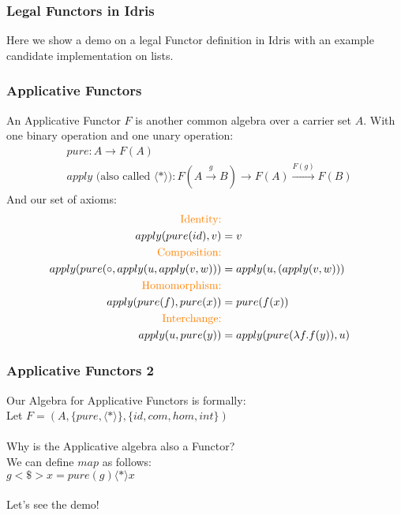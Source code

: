 \documentclass[hyperref={colorlinks = true,linkcolor = blue, citecolor = blue, urlcolor = blue}]{beamer}
\begin{document}
\begin{frame}[fragile]
  \frametitle{Legal Functors in Idris}
  Here we show a demo on a legal Functor definition in Idris with an example
  candidate implementation on lists.
\end{frame}

\begin{frame}[fragile]
  \frametitle{Applicative Functors}
  An Applicative Functor $F$ is another common algebra over a carrier set $A$.
  With one binary operation and one unary operation: 
  \begin{align*}
    &pure : A \rightarrow F(A) \\
    &apply \text{ (also called $\langle \ast \rangle$)} : F(A \overset{g}{\rightarrow} B) \rightarrow F(A) 
               \overset{F(g)}{\rightarrow} F(B)
  \end{align*}
   And our set of axioms:
   \begin{align*}
    \text{\color{orange}{Identity:}}\\
    apply(pure(id), v) &= v \\
    \text{\color{orange}{Composition:}}\\
    apply(pure(\circ,apply(u, apply(v, w))) &= apply(u,(apply(v, w))) \\
    \text{\color{orange}{Homomorphism:}}\\
    apply(pure(f), pure(x)) &= pure(f(x)) \\
    \text{\color{orange}{Interchange:}}\\
    apply(u, pure(y)) &= apply(pure(\lambda f.f(y)),u) 
   \end{align*}
\end{frame}

\begin{frame}[fragile]
  \frametitle{Applicative Functors 2}
  Our Algebra for Applicative Functors is formally: \\
  Let $F = (A,\{pure,\langle \ast \rangle\},\{id, com, hom, int\})$ \\
  \\
  Why is the Applicative algebra also a Functor? \\
  We can define $map$ as follows: \\
  $g <\$> x = pure(g) \langle \ast \rangle x$ \\
  \\
  Let's see the demo!
\end{frame}

\end{document}
